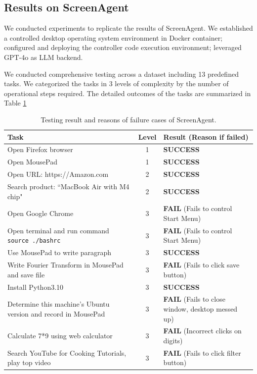 \documentclass[11pt,letterpaper]{article}
\begin{document}
\subsection{Results on ScreenAgent}
%
We conducted experiments to replicate the results of ScreenAgent. 
%
We established a controlled desktop operating system environment in Docker container; configured and deploying the controller code execution environment; leveraged GPT-4o as LLM backend.
%


\noindent We conducted comprehensive testing across a dataset including 13 predefined tasks. 
%
We categorized the tasks in 3 levels of complexity by the number of operational steps required. 
%
The detailed outcomes of the tasks are summarized in Table \ref{tab:task_results}

\begin{table}[htbp]
\centering
\begin{tabular}{|p{6cm}|c|p{6cm}|}
\hline
\textbf{Task} & \textbf{Level} & \textbf{Result (Reason if failed)} \\
\hline
Open Firefox browser & 1 & \textbf{SUCCESS} \\
\hline
Open MousePad & 1 & \textbf{SUCCESS} \\
\hline
Open URL: https://Amazon.com & 2 & \textbf{SUCCESS} \\
\hline
Search product: ``MacBook Air with M4 chip" & 2 & \textbf{SUCCESS} \\
\hline
Open Google Chrome & 3 & \textbf{FAIL} (Fails to control Start Menu) \\
\hline
Open terminal and run command \texttt{source ./bashrc} & 3 & \textbf{FAIL} (Fails to control Start Menu) \\
\hline
Use MousePad to write paragraph & 3 & \textbf{SUCCESS}\\
\hline
Write Fourier Transform in MousePad and save file & 3 & \textbf{FAIL} (Fails to click save button) \\
\hline
Install Python3.10 & 3 & \textbf{SUCCESS} \\
\hline
Determine this machine's Ubuntu version and record in MousePad & 3 & \textbf{FAIL} (Fails to close window, desktop messed up) \\
\hline
Calculate 7*9 using web calculator & 3 & \textbf{FAIL} (Incorrect clicks on digits) \\
\hline
Search YouTube for Cooking Tutorials, play top video & 3 & \textbf{FAIL} (Fails to click filter button) \\
\hline
\end{tabular}
\caption{Testing result and reasons of failure cases of ScreenAgent.}
\label{tab:task_results}
\end{table}
\end{document}
